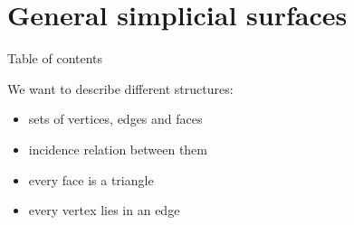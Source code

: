 \section{General simplicial surfaces}
\begin{frame}{Table of contents}
    \tableofcontents[currentsection]
\end{frame}

\begin{frame}{}
    We want to describe different structures:
    \begin{itemize}
        \item<4-> sets of vertices, edges and faces
        \item<5-> incidence relation between them
        \item<6-> every face is a triangle
        \item<7-> every vertex lies in an edge 
    \end{itemize}
\end{frame}


